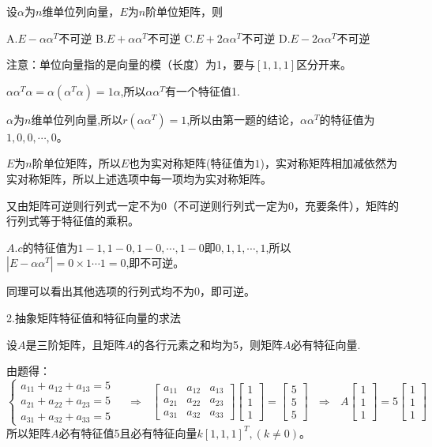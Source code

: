 \documentclass{article}
\begin{document}
设$\alpha$为$n$维单位列向量，$E$为$n$阶单位矩阵，则

\hphantom{~}A.$E-\alpha\alpha^T$不可逆 \hfill B.$E+\alpha\alpha^T$不可逆 \hfill C.$E+2\alpha\alpha^T$不可逆 \hfill D.$E-2\alpha\alpha^T$不可逆
\hphantom{~}

\begin{jie}
注意：单位向量指的是向量的模（长度）为1，要与$[1,1,1]$区分开来。

$\alpha\alpha^T\alpha=\alpha(\alpha^T\alpha)=1\alpha$,所以$\alpha\alpha^T$有一个特征值1.

$\alpha$为$n$维单位列向量,所以$r(\alpha\alpha^T)=1$,所以由第一题的结论，$\alpha\alpha^T$的特征值为$1,0,0,\cdots,0$。

$E$为$n$阶单位矩阵，所以$E$也为实对称矩阵(特征值为$1$)，实对称矩阵相加减依然为实对称矩阵，所以上述选项中每一项均为实对称矩阵。

又由矩阵可逆则行列式一定不为0（不可逆则行列式一定为0，充要条件），矩阵的行列式等于特征值的乘积。

$A$.$c$的特征值为$1-1,1-0,1-0,\cdots,1-0$即$0,1,1,\cdots,1$,所以$|E-\alpha\alpha^T|=0\times 1\cdots 1=0$,即不可逆。

同理可以看出其他选项的行列式均不为0，即可逆。
\end{jie}

2.抽象矩阵特征值和特征向量的求法

设$A$是三阶矩阵，且矩阵$A$的各行元素之和均为5，则矩阵$A$必有特征向量\underline{\hphantom{~~~~~~~~~~~~~}}.

\begin{jie}
由题得：
\begin{equation*}
\begin{cases}
a_{11}+a_{12}+a_{13}=5\\
a_{21}+a_{22}+a_{23}=5\\
a_{31}+a_{32}+a_{33}=5
\end{cases}~~~~~\Rightarrow~~~
\begin{bmatrix}
a_{11}&a_{12}&a_{13} \\
a_{21}&a_{22}&a_{23} \\
a_{31}&a_{32}&a_{33}
\end{bmatrix}
\begin{bmatrix}
1\\ 1\\1
\end{bmatrix}=
\begin{bmatrix}
5\\ 5\\5
\end{bmatrix}~~~\Rightarrow~~~A\begin{bmatrix}
1\\ 1\\1
\end{bmatrix}=5\begin{bmatrix}
1\\ 1\\1
\end{bmatrix}
\end{equation*}
所以矩阵$A$必有特征值5且必有特征向量$k[1,1,1]^T,(k\neq 0)$。
\end{jie}
\end{document}
